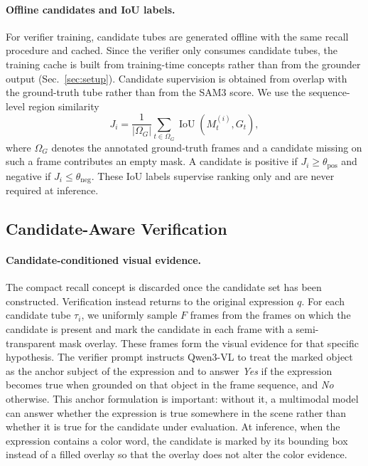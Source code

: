 \paragraph{Offline candidates and IoU labels.}
For verifier training, candidate tubes are generated offline with the same recall procedure and cached. Since the verifier only consumes candidate tubes, the training cache is built from training-time concepts rather than from the grounder output (Sec.~\ref{sec:setup}). Candidate supervision is obtained from overlap with the ground-truth tube rather than from the SAM3 score. We use the sequence-level region similarity
\begin{equation}
J_i
=
\frac{1}{|\Omega_G|}
\sum_{t\in\Omega_G}
\operatorname{IoU}\!\left(M_t^{(i)},G_t\right),
\end{equation}
where $\Omega_G$ denotes the annotated ground-truth frames and a candidate missing on such a frame contributes an empty mask. A candidate is positive if $J_i\ge\theta_{\mathrm{pos}}$ and negative if $J_i\le\theta_{\mathrm{neg}}$. These IoU labels supervise ranking only and are never required at inference.

\subsection{Candidate-Aware Verification}
\label{sec:verify}
\paragraph{Candidate-conditioned visual evidence.}
The compact recall concept is discarded once the candidate set has been constructed. Verification instead returns to the original expression $q$. For each candidate tube $\tau_i$, we uniformly sample $F$ frames from the frames on which the candidate is present and mark the candidate in each frame with a semi-transparent mask overlay. These frames form the visual evidence for that specific hypothesis. The verifier prompt instructs Qwen3-VL to treat the marked object as the anchor subject of the expression and to answer \emph{Yes} if the expression becomes true when grounded on that object in the frame sequence, and \emph{No} otherwise. This anchor formulation is important: without it, a multimodal model can answer whether the expression is true somewhere in the scene rather than whether it is true for the candidate under evaluation. At inference, when the expression contains a color word, the candidate is marked by its bounding box instead of a filled overlay so that the overlay does not alter the color evidence.

